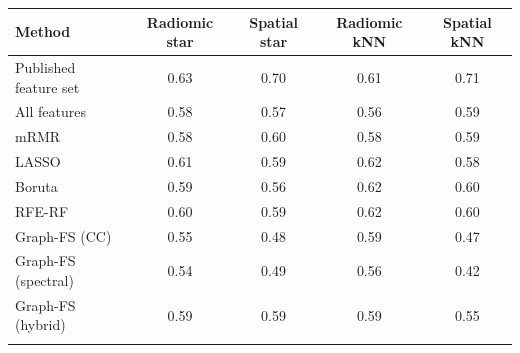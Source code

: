 \begin{tabular}{@{}lcccc@{}}
\toprule
Method & Radiomic star & Spatial star & Radiomic kNN & Spatial kNN \\
\midrule
Published feature set & 0.63 & 0.70 & 0.61 & 0.71 \\
All features & 0.58 & 0.57 & 0.56 & 0.59 \\
mRMR & 0.58 & 0.60 & 0.58 & 0.59 \\
LASSO & 0.61 & 0.59 & 0.62 & 0.58 \\
Boruta & 0.59 & 0.56 & 0.62 & 0.60 \\
RFE-RF & 0.60 & 0.59 & 0.62 & 0.60 \\
Graph-FS (CC) & 0.55 & 0.48 & 0.59 & 0.47 \\
Graph-FS (spectral) & 0.54 & 0.49 & 0.56 & 0.42 \\
Graph-FS (hybrid) & 0.59 & 0.59 & 0.59 & 0.55 \\
\botrule
\end{tabular}
